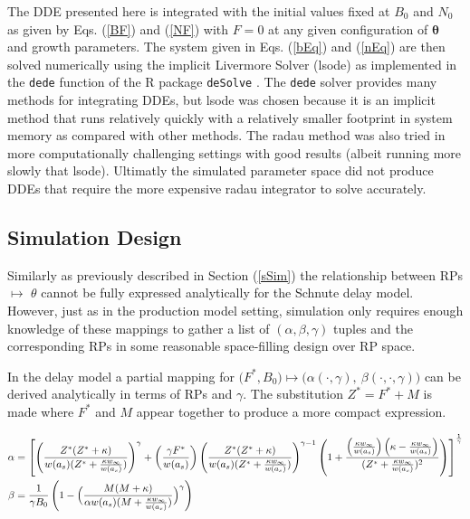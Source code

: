 %
The DDE presented here is integrated with the initial values fixed at $B_0$
and $N_0$ as given by Eqs. (\ref{BF}) and (\ref{NF}) with $F=0$ at any given
configuration of $\bm{\theta}$ and growth parameters. %
The system given in Eqs. (\ref{bEq}) and (\ref{nEq}) are then solved
numerically using the implicit Livermore Solver (lsode) as implemented in the
\verb|dede| function of the R package \verb|deSolve| \cite{soetaert_solving_2010}.
The \verb|dede| solver provides many methods for integrating DDEs, but lsode
was chosen because it is an implicit method that runs relatively quickly with
a relatively smaller footprint in system memory as compared with other methods.
The radau method was also tried in more computationally challenging settings
with good results (albeit running more slowly that lsode). Ultimatly the
simulated parameter space did not produce DDEs that require the more expensive
radau integrator to solve accurately.

%

%
\subsection{Simulation Design}

%
Similarly as previously described in Section (\ref{sSim}) the relationship
between RPs $\mapsto$ $\theta$ cannot be fully expressed analytically for the
Schnute delay model. However, just as in the production model setting,
simulation only requires enough knowledge of these mappings to gather a list
of $(\alpha, \beta, \gamma)$ tuples and the corresponding RPs in some reasonable
space-filling design over RP space. %

In the delay model a partial mapping for
$\big(F^*, B_0\big) \mapsto \big(\alpha(\cdot, \gamma), ~\beta(\cdot, \cdot, \gamma)\big)$
can be derived analytically in terms of RPs and $\gamma$. The substitution
$Z^*=F^*+M$ is made where $F^*$ and $M$ appear together to produce a more
compact expression.

%
\begingroup
\scriptsize
\begin{align}
\alpha & = \left[ \oneA + \twoA \left( 1 + \thrA \right) \right]^{\frac{1}{\gamma}} \label{aDelay}\\
\beta &= \frac{1}{\gamma B_0} \left( 1 - \Big(\frac{M (M + \kappa)}{\alpha w(a_s)(M + \kr)}\Big)^\gamma\right) \label{bDelay}%
\end{align}
\endgroup

